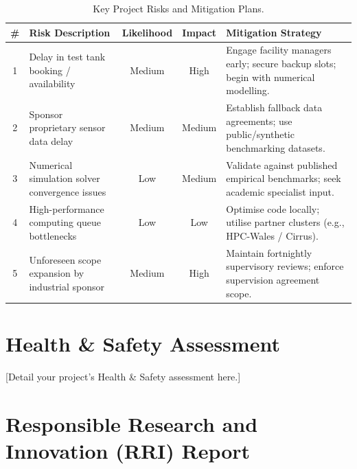 \documentclass[year1,hideguidance]{idcore-ar}
\begin{document}
\begin{table}[htbp]
\centering
\small
\renewcommand{\arraystretch}{1.3}
\begin{tabularx}{\linewidth}{|c|>{\raggedright\arraybackslash}p{4cm}|c|c|>{\raggedright\arraybackslash}X|}
  \hline
  \rowcolor{idcorelight}
  \textbf{\#} & \textbf{Risk Description} & \textbf{Likelihood} & \textbf{Impact} & \textbf{Mitigation Strategy} \\ \hline
  1 & Delay in test tank booking / availability & Medium & High & Engage facility managers early; secure backup slots; begin with numerical modelling. \\ \hline
  2 & Sponsor proprietary sensor data delay & Medium & Medium & Establish fallback data agreements; use public/synthetic benchmarking datasets. \\ \hline
  3 & Numerical simulation solver convergence issues & Low & Medium & Validate against published empirical benchmarks; seek academic specialist input. \\ \hline
  4 & High-performance computing queue bottlenecks & Low & Low & Optimise code locally; utilise partner clusters (e.g., HPC-Wales / Cirrus). \\ \hline
  5 & Unforeseen scope expansion by industrial sponsor & Medium & High & Maintain fortnightly supervisory reviews; enforce supervision agreement scope. \\ \hline
\end{tabularx}
\caption{Key Project Risks and Mitigation Plans.}
\end{table}


\section{Health \& Safety Assessment}

[Detail your project's Health \& Safety assessment here.]


\section{Responsible Research and Innovation (RRI) Report}
\end{document}
